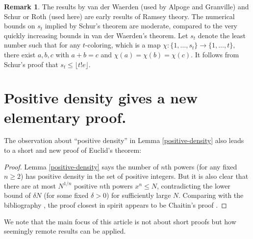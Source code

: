 \documentclass{article}
\theoremstyle{theorem}
\theoremstyle{definition}
\newtheorem*{remark}{Remark}
\begin{document}
\begin{remark}
The results by van der Waerden (used by Alpoge and Granville) and Schur or Roth
(used here)
are early results of Ramsey theory. The numerical bounds on $s_t$ implied
by Schur's theorem are moderate, compared to the very quickly increasing
bounds in van der Waerden's theorem.
Let $s_t$ denote the least number such that for any $t$-coloring, which is a
map $\chi:\{1, \ldots , s_t\} \rightarrow \{1, \ldots , t\},$ there exist
$a,b,c$ with $a+b=c$ and $\chi(a)=\chi(b)=\chi(c)$. It follows from Schur's proof that
$s_t \leq \lfloor t!e\rfloor $.

\end{remark}

\section{Positive density gives a new elementary proof.}
{\label{sec:density}}

The observation about ``positive density'' in Lemma \ref{positive-density}
also leads to a short and new proof of Euclid's theorem:
\begin{proof}
  Lemma {\ref{positive-density}} says the number of
  $n$th powers (for any fixed $n \geq 2$)
  has positive density in the set of positive integers.
But it is also clear that there are at most
$N^{1/n}$  positive $n$th powers $x^n \leq N$,
contradicting the lower bound of $\delta N$ (for some fixed $\delta >0$)
for sufficiently large $N$. Comparing with
the bibliography \cite{Mestrovic}, the proof closest in spirit
appears to be Chaitin's proof \cite{Chaitin}.
\end{proof}
We note that the main focus of this article is not about short proofs 
but how seemingly remote results can be applied.
\end{document}
